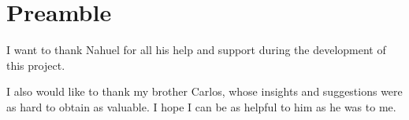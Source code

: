 
\chapter*{Preamble}\label{chap:preamble}
\thispagestyle{empty}


\thispagestyle{empty}
\vspace{1cm}

I want to thank Nahuel for all his help and support during the development of
this project.

I also would like to thank my brother Carlos, whose insights and suggestions
were as hard to obtain as valuable. I hope I can be as helpful to him as he was
to me.

\cleardoublepage%

